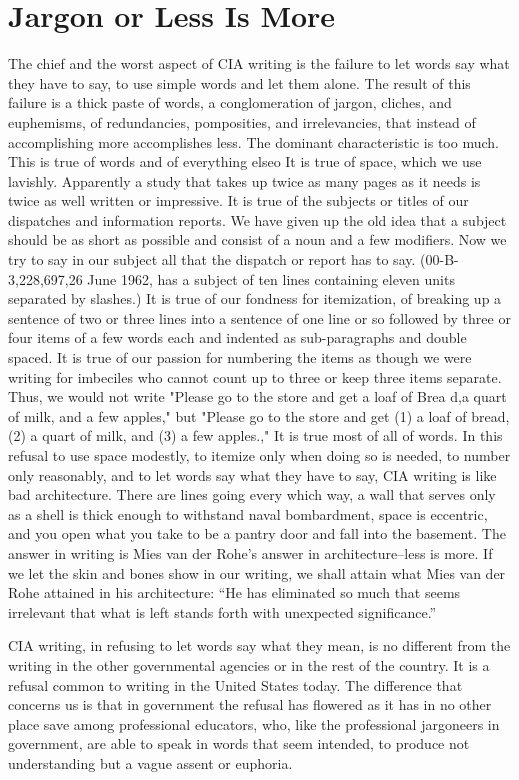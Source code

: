 \documentclass[
    oneside,
    11pt,
    draft
]{memoir}
\begin{document}
\chapter{Jargon or Less Is More}
The chief and the worst aspect of CIA writing is the failure to let words say what they have to say, to use simple words and let them alone. The result of this failure is a thick paste of words, a conglomeration of jargon, cliches, and euphemisms, of redundancies, pomposities, and irrelevancies, that instead of accomplishing more accomplishes less. The dominant characteristic is too much. This is true of words and of everything elseo It is true of space, which we use lavishly. Apparently a study that takes up twice as many pages as it needs is twice as well written or impressive. It is true of the subjects or titles of our dispatches and information reports. We have given up the old idea that a subject should be as short as possible and consist of a noun and a few modifiers. Now we try to say in our subject all that the dispatch or report has to say. (00-B-3,228,697,26 June 1962, has a subject of ten lines containing eleven units separated by slashes.) It is true of our fondness for itemization, of breaking up a sentence of two or three lines into a sentence of one line or so followed by three or four items of a few words each and indented as sub-paragraphs and double spaced. It is true of our passion for numbering the items as though we were writing for imbeciles who cannot count up to three or keep three items separate. Thus, we would not write "Please go to the store and get a loaf of Brea d,a quart of milk, and a few apples," but "Please go to the store and get (1) a loaf of bread, (2) a quart of milk, and (3) a few apples.," It is true most of all of words. In this refusal to use space modestly, to itemize only when doing so is needed, to number only reasonably, and to let words say what they have to say, CIA writing is like bad architecture. There are lines going every which way, a wall that serves only as a shell is thick enough to withstand naval bombardment, space is eccentric, and you open what you take to be a pantry door and fall into the basement. The answer in writing is Mies van der Rohe's answer in architecture--less is more. If we let the skin and bones show in our writing, we shall attain what Mies van der Rohe attained in his architecture: \enquote{He has eliminated so much that seems irrelevant that what is left stands forth with unexpected significance.}

CIA writing, in refusing to let words say what they mean, is no different from the writing in the other governmental agencies or in the rest of the country. It is a refusal common to writing in the United States today. The difference that concerns us is that in government the refusal has flowered as it has in no other place save among professional educators, who, like the professional jargoneers in government, are able to speak in words that seem intended, to produce not understanding but a vague assent or euphoria. 
\end{document}
